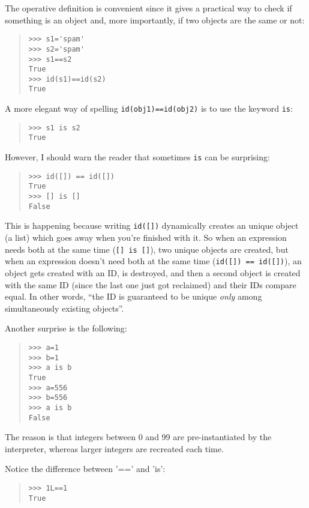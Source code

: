 \documentclass[10pt,english]{article}
\begin{document}
The operative definition is convenient since it gives a practical way
to check if something is an object and, more importantly, if two
objects are the same or not:
\begin{quote}
\begin{verbatim}>>> s1='spam'
>>> s2='spam'
>>> s1==s2
True
>>> id(s1)==id(s2)
True\end{verbatim}
\end{quote}

A more elegant way of spelling \texttt{id(obj1)==id(obj2)} is to use the
keyword \texttt{is}:
\begin{quote}
\begin{verbatim}>>> s1 is s2
True\end{verbatim}
\end{quote}

However, I should warn the reader that sometimes \texttt{is} can be surprising:
\begin{quote}
\begin{verbatim}>>> id([]) == id([])
True
>>> [] is []
False\end{verbatim}
\end{quote}

This is happening because writing \texttt{id([])} dynamically creates an unique
object (a list) which goes away when you're finished with it.  So when an
expression needs both at the same time (\texttt{[] is []}), two unique objects
are created, but when an expression doesn't need both at the same time
(\texttt{id([]) == id([])}), an object gets created with an ID, is destroyed,
and then a second object is created with the same ID (since the last one
just got reclaimed) and their IDs compare equal. In other words, ``the 
ID is guaranteed to be unique \emph{only} among simultaneously existing objects''.

Another surprise is the following:
\begin{quote}
\begin{verbatim}>>> a=1
>>> b=1
>>> a is b
True
>>> a=556
>>> b=556
>>> a is b
False\end{verbatim}
\end{quote}

The reason is that integers between 0 and 99 are pre-instantiated by the
interpreter, whereas larger integers are recreated each time.

Notice the difference between '==' and 'is':
\begin{quote}
\begin{verbatim}>>> 1L==1
True\end{verbatim}
\end{quote}
\end{document}
